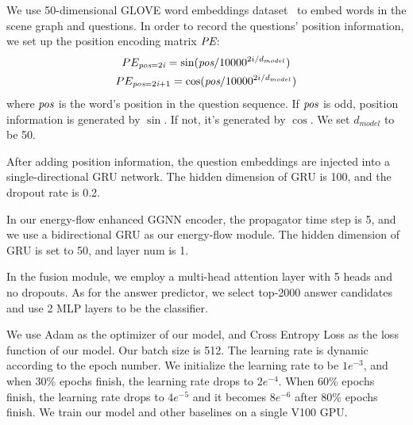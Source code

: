 \documentclass[letterpaper]{article} %
\begin{document}
We use 50-dimensional GLOVE word embeddings dataset~\cite{pennington-etal-2014-glove} to embed words in the scene graph and questions. In order to record the questions' position information, we set up the position encoding matrix $\emph{PE}$:
\begin{gather}
    PE_{\emph{pos}=2\emph{i}} = \sin(\emph{pos}/10000^{2i/d_{model}})\\
    PE_{\emph{pos}=2\emph{i}+1} = \cos(\emph{pos}/10000^{2i/d_{model}})
\end{gather}
where $\emph{pos}$ is the word's position in the question sequence. If $\emph{pos}$ is odd, position information is generated by $\sin$. If not, it's generated by $\cos$. We set $d_{model}$ to be 50.

After adding position information, the question embeddings are injected into a single-directional GRU network. The hidden dimension of GRU is 100, and the dropout rate is 0.2.

In our energy-flow enhanced GGNN encoder, the propagator time step is 5, and we use a bidirectional GRU as our energy-flow module. The hidden dimension of GRU is set to 50, and layer num is 1. 

In the fusion module, we employ a multi-head attention layer with 5 heads and no dropouts. As for the answer predictor, we select top-2000 answer candidates and use 2 MLP layers to be the classifier.

We use Adam as the optimizer of our model, and Cross Entropy Loss as the loss function of our model. Our batch size is 512. The learning rate is dynamic according to the epoch number. We initialize the learning rate to be $1e^{-3}$, and when 30\% epochs finish, the learning rate drops to $2e^{-4}$. When 60\%
epochs finish, the learning rate drops to $4e^{-5}$ and it becomes $8e^{-6}$ after 80\% epochs finish. We train our model and other baselines on a single V100 GPU.

\end{document}
